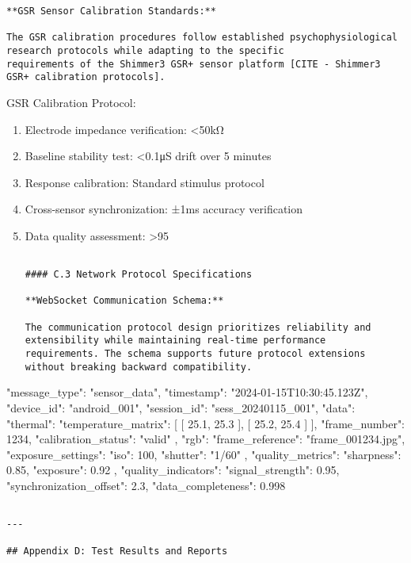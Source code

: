 \documentclass[11pt,a4paper]{report}
\begin{document}
{{\begin{itemize}
\begin{verbatim}
**GSR Sensor Calibration Standards:**

The GSR calibration procedures follow established psychophysiological research protocols while adapting to the specific
requirements of the Shimmer3 GSR+ sensor platform [CITE - Shimmer3 GSR+ calibration protocols].

\end{verbatim}
\end{itemize}
GSR Calibration Protocol:
\begin{enumerate}
\item Electrode impedance verification: <50kΩ
\item Baseline stability test: <0.1μS drift over 5 minutes
\item Response calibration: Standard stimulus protocol
\item Cross-sensor synchronization: ±1ms accuracy verification
\item Data quality assessment: >95%
\begin{verbatim}

#### C.3 Network Protocol Specifications

**WebSocket Communication Schema:**

The communication protocol design prioritizes reliability and extensibility while maintaining real-time performance
requirements. The schema supports future protocol extensions without breaking backward compatibility.

\end{verbatim}
\end{enumerate}
{
  "message\_type": "sensor\_data",
  "timestamp": "2024-01-15T10:30:45.123Z",
  "device\_id": "android\_001",
  "session\_id": "sess\_20240115\_001",
  "data": {
    "thermal": {
      "temperature\_matrix": [
        [
          25.1,
          25.3
        ],
        [
          25.2,
          25.4
        ]
      ],
      "frame\_number": 1234,
      "calibration\_status": "valid"
    },
    "rgb": {
      "frame\_reference": "frame\_001234.jpg",
      "exposure\_settings": {
        "iso": 100,
        "shutter": "1/60"
      },
      "quality\_metrics": {
        "sharpness": 0.85,
        "exposure": 0.92
      }
    }
  },
  "quality\_indicators": {
    "signal\_strength": 0.95,
    "synchronization\_offset": 2.3,
    "data\_completeness": 0.998
  }
}
\begin{verbatim}

---

## Appendix D: Test Results and Reports


\end{verbatim}}}
\end{document}
